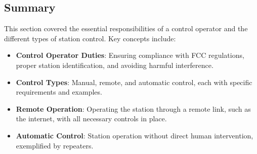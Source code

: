 
\subsection*{Summary}
This section covered the essential responsibilities of a control operator and the different types of station control. Key concepts include:

\begin{itemize}
    \item \textbf{Control Operator Duties}: Ensuring compliance with FCC regulations, proper station identification, and avoiding harmful interference.
    \item \textbf{Control Types}: Manual, remote, and automatic control, each with specific requirements and examples.
    \item \textbf{Remote Operation}: Operating the station through a remote link, such as the internet, with all necessary controls in place.
    \item \textbf{Automatic Control}: Station operation without direct human intervention, exemplified by repeaters.
\end{itemize}
